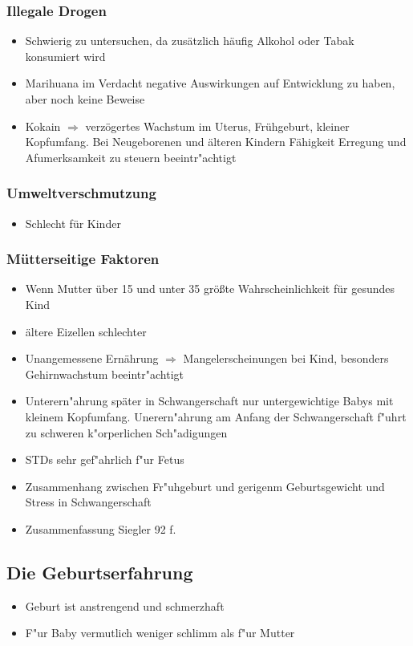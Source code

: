 \subsubsection{Illegale Drogen}
\begin{itemize}
	\item
		Schwierig zu untersuchen, da zusätzlich häufig Alkohol oder Tabak konsumiert wird
	\item
		Marihuana im Verdacht negative Auswirkungen auf Entwicklung zu haben, aber noch keine Beweise
	\item
		Kokain $\Rightarrow$ verzögertes Wachstum im Uterus, Frühgeburt, kleiner Kopfumfang. Bei Neugeborenen und älteren Kindern Fähigkeit Erregung und Afumerksamkeit zu steuern beeintr"achtigt
\end{itemize}

\subsubsection{Umweltverschmutzung}
\begin{itemize}
	\item
		Schlecht für Kinder
\end{itemize}


\subsubsection{Mütterseitige Faktoren}
\begin{itemize}
	\item
		Wenn Mutter über 15 und unter 35 größte Wahrscheinlichkeit für gesundes Kind
	\item
		ältere Eizellen schlechter
	\item
		Unangemessene Ernährung $\Rightarrow$ Mangelerscheinungen bei Kind, besonders Gehirnwachstum beeintr"achtigt
	\item
		Unterern"ahrung später in Schwangerschaft nur untergewichtige Babys mit kleinem Kopfumfang. Unerern"ahrung am Anfang der Schwangerschaft f"uhrt zu schweren k"orperlichen Sch"adigungen
	\item
		STDs sehr gef"ahrlich f"ur Fetus
	\item
		Zusammenhang zwischen Fr"uhgeburt und gerigenm Geburtsgewicht und Stress in Schwangerschaft
	\item
		Zusammenfassung Siegler 92 f.
\end{itemize}


\subsection{Die Geburtserfahrung}
\begin{itemize}
	\item
		Geburt ist anstrengend und schmerzhaft
	\item
		F"ur Baby vermutlich weniger schlimm als f"ur Mutter
\end{itemize}

